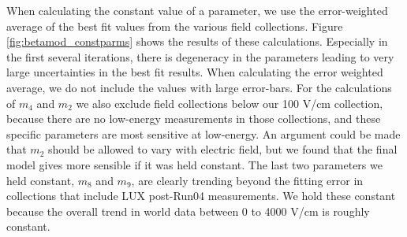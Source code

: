 When calculating the constant value of a parameter, we use the error-weighted average of the best fit values from the various field collections. Figure \ref{fig:betamod_constparms} shows the results of these calculations. Especially in the first several iterations, there is degeneracy in the parameters leading to very large uncertainties in the best fit results. When calculating the error weighted average, we do not include the values with large error-bars. For the calculations of $m_4$ and $m_2$ we also exclude field collections below our 100 V/cm collection, because there are no low-energy measurements in those collections, and these specific parameters are most sensitive at low-energy. An argument could be made that $m_2$ should be allowed to vary with electric field, but we found that the final model gives more sensible if it was held constant. The last two parameters we held constant, $m_8$ and $m_9$, are clearly trending beyond the fitting error in collections that include LUX post-Run04 measurements. We hold these constant because the overall trend in world data between 0 to 4000 V/cm is roughly constant.
